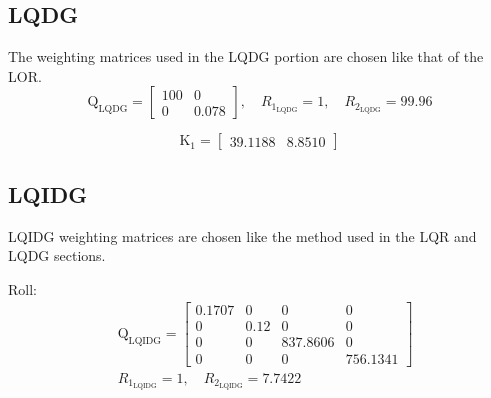 \documentclass[conference]{IEEEtran}
\begin{document}
\subsection{LQDG}
The weighting matrices used in the LQDG portion are chosen like that of the LOR.
\begin{equation}
	\boldsymbol{\mathrm{Q}}_{\text{LQDG}} = \begin{bmatrix}
		100 & 0\\
		0 & 0.078
	\end{bmatrix}, \quad R_{1_{\text{LQDG}}} =  1, \quad R_{2_{\text{LQDG}}} =  99.96
\end{equation}

		

\begin{equation}
    \boldsymbol{\mathrm{K_{1}}} = \begin{bmatrix}
        39.1188   & 8.8510
    \end{bmatrix}
\end{equation}

\subsection{LQIDG}
LQIDG weighting matrices are chosen like the method used in the LQR and LQDG sections.

Roll:
\begin{equation}
    \begin{split}
        &\boldsymbol{\mathrm{Q_{{\text{LQIDG}}}}} = \begin{bmatrix}
            0.1707 &0& 0& 0\\
            0 &  0.12 & 0 &0 \\
            0 & 0 & 837.8606 & 0\\
            0 & 0 & 0 & 756.1341
        \end{bmatrix}
        \\[1em]
        &R_{1_{\text{LQIDG}}} =  1, \quad R_{2_{\text{LQIDG}}} =  7.7422
    \end{split}
\end{equation}
\end{document}

